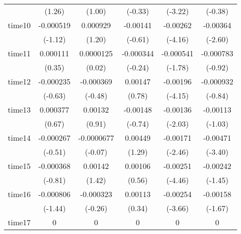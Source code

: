 \begin{table}[htbp]
\begin{tabular}{l*{5}{c}}
            &      (1.26)         &      (1.00)         &     (-0.33)         &     (-3.22)         &     (-0.38)         \\
time10      &   -0.000519         &    0.000929         &    -0.00141         &    -0.00262\sym{***}&    -0.00364\sym{**} \\
            &     (-1.12)         &      (1.20)         &     (-0.61)         &     (-4.16)         &     (-2.60)         \\
time11      &    0.000111         &   0.0000125         &   -0.000344         &   -0.000541         &   -0.000783         \\
            &      (0.35)         &      (0.02)         &     (-0.24)         &     (-1.78)         &     (-0.92)         \\
time12      &   -0.000235         &   -0.000369         &     0.00147         &    -0.00196\sym{***}&   -0.000932         \\
            &     (-0.63)         &     (-0.48)         &      (0.78)         &     (-4.15)         &     (-0.84)         \\
time13      &    0.000377         &     0.00132         &    -0.00148         &    -0.00136\sym{*}  &    -0.00113         \\
            &      (0.67)         &      (0.91)         &     (-0.74)         &     (-2.03)         &     (-1.03)         \\
time14      &   -0.000267         &  -0.0000677         &     0.00449         &    -0.00171\sym{*}  &    -0.00471\sym{***}\\
            &     (-0.51)         &     (-0.07)         &      (1.29)         &     (-2.46)         &     (-3.40)         \\
time15      &   -0.000368         &     0.00142         &     0.00106         &    -0.00251\sym{***}&    -0.00242         \\
            &     (-0.81)         &      (1.42)         &      (0.56)         &     (-4.46)         &     (-1.45)         \\
time16      &   -0.000806         &   -0.000323         &     0.00113         &    -0.00254\sym{***}&    -0.00158         \\
            &     (-1.44)         &     (-0.26)         &      (0.34)         &     (-3.66)         &     (-1.67)         \\
time17      &           0         &           0         &           0         &           0         &           0         \\

\end{tabular}
\end{table}
